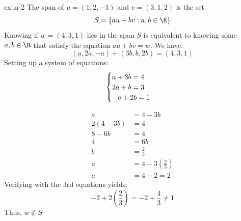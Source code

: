 \begin{solution}{ex:la-2}
  The span of $u = (1,2,-1)$ and $v=(3,1,2)$ is the set
  \[
    S=\left\{au+bv:a,b \in \R\right\}
  \]
  Knowing if $w=(4,3,1)$ lies in the span $S$ is equivalent to knowing some $a,b\in \R$ that satisfy the equation $au+bv=w$. We have:
  \[
    (a,2a,-a)+(3b,b,2b)=(4,3,1)
  \]
  Setting up a system of equations:
  $$
  \begin{cases}
    a+3b=4\\
    2a+b=3\\
    -a+2b=1
  \end{cases}\\
  $$

  \begin{align*}
    a&=4-3b\\
    2(4-3b)&=4\\
    8-6b&=4\\
    4&=6b\\
    b&=\frac{2}{3}\\
    a&=4-3(\frac{2}{3})\\
    a&=4-2=2
  \end{align*}
  Verifying with the 3rd equations yields:
  \[
    -2+2(\frac{2}{3})=-2+\frac{4}{3}\neq 1
  \]
  Thus, $w\notin S$

\end{solution}

